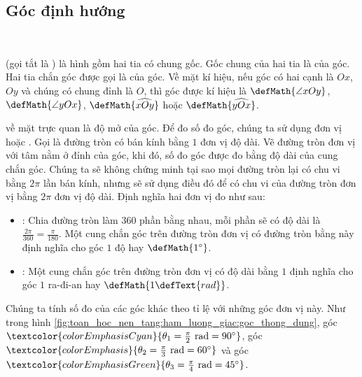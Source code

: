 \subsection{Góc định hướng}

\ %

 (gọi tắt là ) là hình gồm hai tia có chung gốc. Gốc chung của hai tia là  của góc. Hai tia chắn góc được gọi là  của góc. Về mặt kí hiệu, nếu góc có hai cạnh là $Ox$, $Oy$ và chúng có chung đỉnh là $O$, thì góc được kí hiệu là $\defMath{\angle xOy}$,  $\defMath{\angle yOx}$, $\defMath{\widehat{xOy}}$ hoặc $\defMath{\widehat{yOx}}$.

 về mặt trực quan là độ mở của góc. Để đo số đo góc, chúng ta sử dụng đơn vị  hoặc . Gọi  là đường tròn có bán kính bằng $1$ đơn vị độ dài. Vẽ đường tròn đơn vị với tâm nằm ở đỉnh của góc, khi đó, số đo góc được đo bằng độ dài của cung chắn góc. Chúng ta sẽ không chứng minh tại sao mọi đường tròn lại có chu vi bằng $2\pi$ lần bán kính, nhưng sẽ sử dụng điều đó để có chu vi của đường tròn đơn vị bằng $2\pi$ đơn vị độ dài. Định nghĩa hai đơn vị đo như sau:
\begin{itemize}
   \item {}: Chia đường tròn làm $360$ phần bằng nhau, mỗi phần sẽ có độ dài là $\frac{2\pi}{360} = \frac{\pi}{180}$. Một cung chắn góc trên đường tròn đơn vị có đường tròn bằng này định nghĩa cho góc $1$ độ hay $\defMath{1^\circ}$.
   \item {}: Một cung chắn góc trên đường tròn đơn vị có độ dài bằng $1$ định nghĩa cho góc $1$ ra-đi-an hay $\defMath{1\defText{ rad}}$.
\end{itemize}

Chúng ta tính số đo của các góc khác theo tỉ lệ với những góc đơn vị này. Như trong hình \ref{fig:toan_hoc_nen_tang:ham_luong_giac:goc_thong_dung}, góc $\textcolor{colorEmphasisCyan}{\theta_1 = \frac{\pi}{2} \text{ rad} = 90^\circ}$, góc $\textcolor{colorEmphasis}{\theta_2 = \frac{\pi}{3} \text{ rad} = 60^\circ}$ và góc $\textcolor{colorEmphasisGreen}{\theta_3 = \frac{\pi}{4} \text{ rad} = 45^\circ}$.


